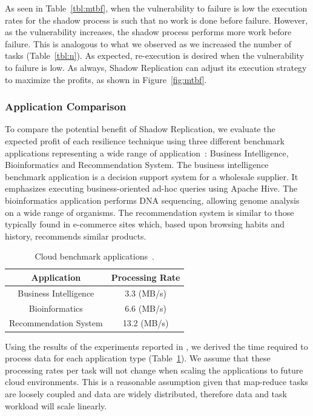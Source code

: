 As seen in Table~\ref{tbl:mtbf}, when the vulnerability to
failure is low the execution rates for the shadow process is such
that no work is done before failure. However, as the
vulnerability increases, the shadow process performs more work before
failure. This is analogous to what we observed as we increased the
number of tasks (Table~\ref{tbl:n}). As expected,
re-execution is desired when the vulnerability to failure is
low. As always, Shadow Replication can adjust its execution strategy to maximize the profits, as shown in Figure~\ref{fig:mtbf}.

\subsubsection{Application Comparison}

To compare the potential benefit of Shadow Replication, we evaluate
the expected profit of each resilience technique using three different
benchmark applications representing a wide range of
application~\cite{mrbs}: Business Intelligence, Bioinformatics and
Recommendation System. The business intelligence benchmark application
is a decision support system for a wholesale supplier. It emphasizes
executing business-oriented ad-hoc queries using Apache Hive. The
bioinformatics application performs DNA sequencing, allowing genome
analysis on a wide range of organisms. The recommendation system is
similar to those typically found in e-commerce sites which, based upon
browsing habits and history, recommends similar
products.

\begin{table}[h]
	\centering
    	\caption{Cloud benchmark applications~\cite{mrbs}.}
		\begin{tabular}{|c|c|}
			\hline
			Application               & Processing Rate \\
			\hline
			Business Intelligence     & 3.3 (MB/s)      \\ 
			Bioinformatics            & 6.6 (MB/s)      \\ 
			Recommendation System     & 13.2 (MB/s)     \\
			\hline
       \end{tabular}
	   \label{tbl:application_processing_rates}
\end{table}

Using the results of the experiments reported in \cite{mrbs}, we
derived the time required to process data for each application type (Table~\ref{tbl:application_processing_rates}). We assume that
these processing rates per task will not change when scaling the
applications to future cloud environments. This is a reasonable
assumption given that map-reduce tasks are loosely coupled and data
are widely distributed, therefore data and task workload will scale
linearly.

